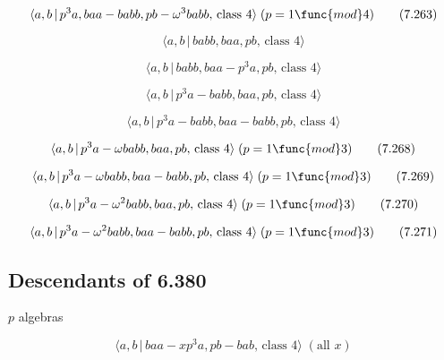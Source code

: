 \documentclass[10pt]{article}
\begin{document}
\begin{equation}
\langle a,b\,|\,p^{3}a,baa-babb,pb-\omega ^{3}babb,\,\text{class }4\rangle
\;(p=1\func{mod}4)  \tag{7.263}
\end{equation}

\begin{equation}
\langle a,b\,|\,babb,baa,pb,\,\text{class }4\rangle  \tag{7.264}
\end{equation}

\begin{equation}
\langle a,b\,|\,babb,baa-p^3a,pb,\,\text{class }4\rangle  \tag{7.265}
\end{equation}

\begin{equation}
\langle a,b\,|\,p^3a-babb,baa,pb,\,\text{class }4\rangle  \tag{7.266}
\end{equation}

\begin{equation}
\langle a,b\,|\,p^3a-babb,baa-babb,pb,\,\text{class }4\rangle  \tag{7.267}
\end{equation}

\begin{equation}
\langle a,b\,|\,p^{3}a-\omega babb,baa,pb,\,\text{class }4\rangle \;(p=1%
\func{mod}3)  \tag{7.268}
\end{equation}

\begin{equation}
\langle a,b\,|\,p^{3}a-\omega babb,baa-babb,pb,\,\text{class }4\rangle \;(p=1%
\func{mod}3)  \tag{7.269}
\end{equation}

\begin{equation}
\langle a,b\,|\,p^{3}a-\omega ^{2}babb,baa,pb,\,\text{class }4\rangle \;(p=1%
\func{mod}3)  \tag{7.270}
\end{equation}

\begin{equation}
\langle a,b\,|\,p^{3}a-\omega ^{2}babb,baa-babb,pb,\,\text{class }4\rangle
\;(p=1\func{mod}3)  \tag{7.271}
\end{equation}

\subsection{Descendants of 6.380}

$p$ algebras

\begin{equation}
\langle a,b\,|\,baa-xp^3a,pb-bab,\,\text{class }4\rangle \;(\text{all }x) 
\tag{7.272}
\end{equation}
\end{document}
